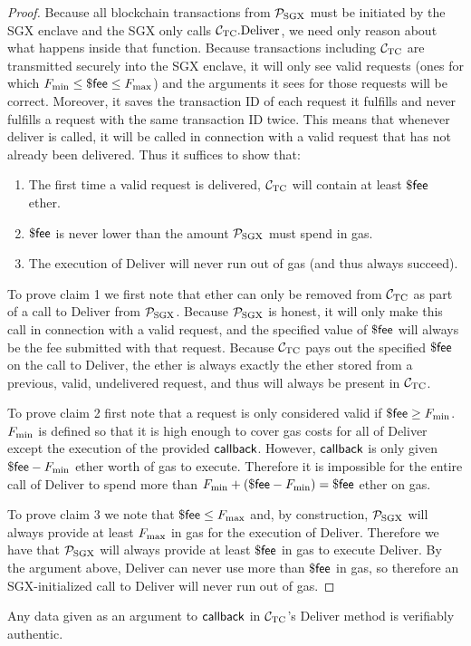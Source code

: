 \begin{proof}

Because all blockchain transactions from $\mathcal{P}_\mathrm{SGX}$ must be initiated by the SGX enclave and the SGX only calls $\mathcal{C}_\mathrm{TC}.{\rm Deliver}$,
we need only reason about what happens inside that function.
Because transactions including $\mathcal{C}_\mathrm{TC}$ are transmitted securely into the SGX enclave, it will only see valid requests (ones for which $F_{\rm min} \leq \${\sf fee} \leq F_{\rm max}$) and the arguments it sees for those requests will be correct.
Moreover, it saves the transaction ID of each request it fulfills and never fulfills a request with the same transaction ID twice.
This means that whenever deliver is called, it will be called in connection with a valid request that has not already been delivered.
Thus it suffices to show that:
\begin{enumerate}
  \item The first time a valid request is delivered, $\mathcal{C}_\mathrm{TC}$ will contain at least $\${\sf fee}$ ether.
  \item $\${\sf fee}$ is never lower than the amount $\mathcal{P}_\mathrm{SGX}$ must spend in gas.
  \item The execution of Deliver will never run out of gas (and thus always succeed).
\end{enumerate}

To prove claim 1 we first note that ether can only be removed from $\mathcal{C}_\mathrm{TC}$ as part of a call to Deliver from $\mathcal{P}_\mathrm{SGX}$.
Because $\mathcal{P}_\mathrm{SGX}$ is honest, it will only make this call in connection with a valid request, and the specified value of $\${\sf fee}$ will always be the fee submitted with that request.
Because $\mathcal{C}_\mathrm{TC}$ pays out the specified $\${\sf fee}$ on the call to Deliver, the ether is always exactly the ether stored from a previous, valid, undelivered request, and thus will always be present in $\mathcal{C}_\mathrm{TC}$.

To prove claim 2 first note that a request is only considered valid if $\${\sf fee} \geq F_{\rm min}$.
$F_{\rm min}$ is defined so that it is high enough to cover gas costs for all of Deliver except the execution of the provided ${\sf callback}$.
However, ${\sf callback}$ is only given $\${\sf fee} - F_{\rm min}$ ether worth of gas to execute.
Therefore it is impossible for the entire call of Deliver to spend more than $F_{\rm min} + (\${\sf fee} - F_{\rm min}) = \${\sf fee}$ ether on gas.

To prove claim 3 we note that $\${\sf fee} \leq F_{\rm max}$ and, by construction, $\mathcal{P}_\mathrm{SGX}$ will always provide at least $F_{\rm max}$ in gas for the execution of Deliver.
Therefore we have that $\mathcal{P}_\mathrm{SGX}$ will always provide at least $\${\sf fee}$ in gas to execute Deliver.
By the argument above, Deliver can never use more than $\${\sf fee}$ in gas, so therefore an SGX-initialized call to Deliver will never run out of gas.
\end{proof}



\begin{lemma} \label{lem:authentic-delivery}
Any data given as an argument to ${\sf callback}$ in $\mathcal{C}_\mathrm{TC}$'s Deliver method is verifiably authentic.
\end{lemma}


